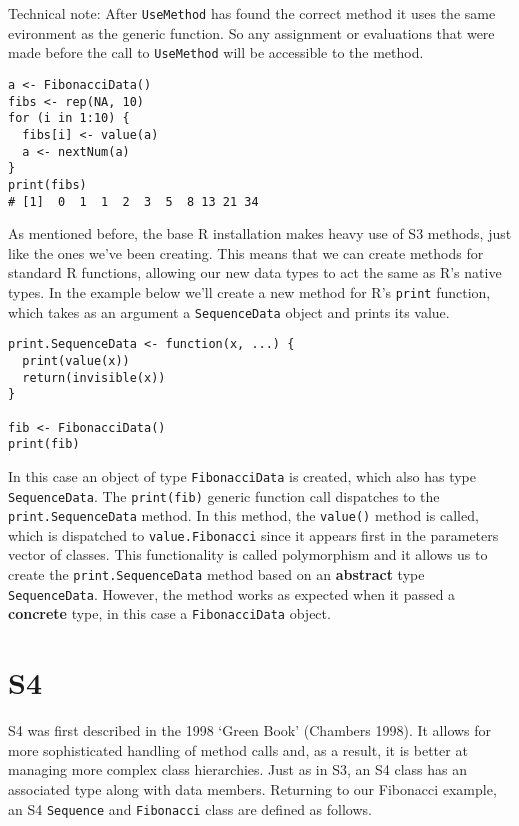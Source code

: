 Technical note: After \texttt{UseMethod} has found the correct method it
uses the same evironment as the generic function. So any assignment or
evaluations that were made before the call to \texttt{UseMethod} will be
accessible to the method.

\begin{verbatim}
a <- FibonacciData()
fibs <- rep(NA, 10)
for (i in 1:10) {
  fibs[i] <- value(a)
  a <- nextNum(a)
}
print(fibs)
# [1]  0  1  1  2  3  5  8 13 21 34
\end{verbatim}

As mentioned before, the base R installation makes heavy use of S3
methods, just like the ones we've been creating. This means that we can
create methods for standard R functions, allowing our new data types to
act the same as R's native types. In the example below we'll create a
new method for R's \texttt{print} function, which takes as an argument a
\texttt{SequenceData} object and prints its value.

\begin{verbatim}
print.SequenceData <- function(x, ...) {
  print(value(x))
  return(invisible(x))
}

fib <- FibonacciData()
print(fib)
\end{verbatim}

In this case an object of type \texttt{FibonacciData} is created, which
also has type \texttt{SequenceData}. The \texttt{print(fib)} generic
function call dispatches to the \texttt{print.SequenceData} method. In
this method, the \texttt{value()} method is called, which is dispatched
to \texttt{value.Fibonacci} since it appears first in the parameters
vector of classes. This functionality is called polymorphism and it
allows us to create the \texttt{print.SequenceData} method based on an
\textbf{abstract} type \texttt{SequenceData}. However, the method works
as expected when it passed a \textbf{concrete} type, in this case a
\texttt{FibonacciData} object.

\hypertarget{s4-ss}{%
\section{S4}\label{s4-ss}}

S4 was first described in the 1998 `Green Book' (Chambers 1998). It
allows for more sophisticated handling of method calls and, as a result,
it is better at managing more complex class hierarchies. Just as in S3,
an S4 class has an associated type along with data members. Returning to
our Fibonacci example, an S4 \texttt{Sequence} and \texttt{Fibonacci}
class are defined as follows.

